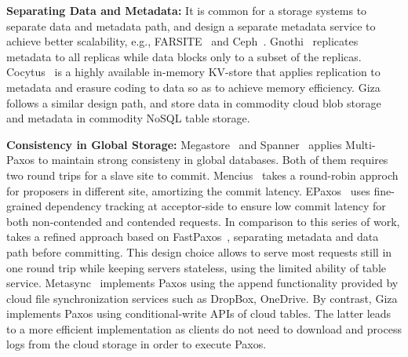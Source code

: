 
{\bf Separating Data and Metadata:}
It is common for a storage systems to separate data and metadata path, and
design a separate metadata service to achieve better scalability, e.g.,
FARSITE~\cite{adya02farsite} and Ceph~\cite{weil06ceph}.
Gnothi~\cite{wang12gnothi} replicates metadata to all replicas while data blocks
only to a subset of the replicas. Cocytus~\cite{zhang16efficient} is a highly
available in-memory KV-store that applies replication to metadata and erasure
coding to data so as to achieve memory efficiency. Giza follows a similar design
path, and store data in commodity cloud blob storage and metadata in commodity
NoSQL table storage.

{\bf Consistency in Global Storage:} Megastore~\cite{baker11megastore} and
Spanner~\cite{spanner:osdi12} applies Multi-Paxos to maintain strong consisteny
in global databases. Both of them requires two round trips for a slave site to
commit. Mencius~\cite{mao08mencius} takes a round-robin approch for proposers in
different site, amortizing the commit latency. EPaxos~\cite{epaxos:sosp13} uses
fine-grained dependency tracking at acceptor-side to ensure low commit latency
for both non-contended and contended requests. In comparison to this series of
work, \name takes a refined approach based on FastPaxos~\cite{lamport05fast},
separating metadata and data path before committing. This design choice allows
\name to serve most requests still in one round trip while keeping servers
stateless, using the limited ability of table service.
Metasync~\cite{metasync:atc15} implements Paxos using the append functionality
provided by cloud file synchronization services such as DropBox, OneDrive. By
contrast, Giza implements Paxos using conditional-write APIs of cloud tables.
The latter leads to a more efficient implementation as clients do not need to
download and process logs from the cloud storage in order to execute Paxos.


